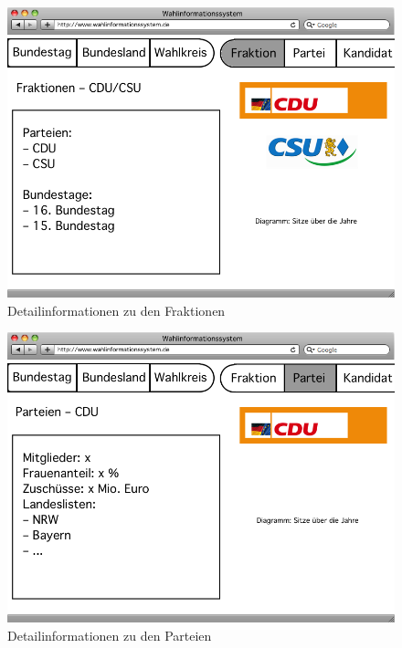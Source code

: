 \documentclass[a4paper]{article}
\begin{document}
\begin{figure}[h!]
\centering
\includegraphics[scale=0.4]{Mockups/fraktion}
\caption{Detailinformationen zu den Fraktionen}
\end{figure}

\begin{figure}[h!]
\centering
\includegraphics[scale=0.4]{Mockups/partei}
\caption{Detailinformationen zu den Parteien}
\end{figure}
\end{document}
